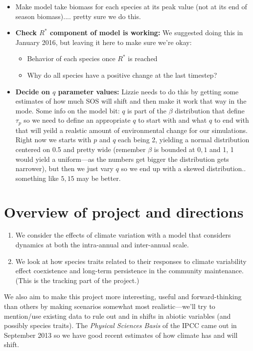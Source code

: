 \documentclass[11pt,a4paper,oneside]{article}
\begin{document}
\begin{itemize}
\item Make model take biomass for each species at its peak value (not at its end of season biomass).... pretty sure we do this.
\item {\bf Check $R^{*}$ component of model is working:} We suggested doing this in January 2016, but leaving it here to make sure we're okay:
\begin{itemize}
\item Behavior of each species once $R^{*}$ is reached
\item Why do all species have a positive change at the last timestep?
\end{itemize}
\item {\bf Decide on $q$ parameter values:}
Lizzie needs to do this by getting some estimates of how much SOS will shift and then make it work that way in the mode. Some info on the model bit: $q$ is part of the $\beta$ distribution that define $\tau_{p}$ so we need to define an appropriate $q$ to start with and what $q$ to end with that will yeild a realstic amount of environmental change for our simulations. Right now we starts with $p$ and $q$ each being 2, yielding a normal distribution centered on 0.5 and pretty wide (remember $\beta$ is bounded at $0,1$ and 1, 1 would yield a uniform---as the numbers get bigger the distribution gets narrower), but then we just vary $q$ so we end up with a skewed distribution.. something like $5,15$ may be better.
\end{itemize}

\newpage
\section{Overview of project and directions}
\noindent 
\begin{enumerate}
\item We consider the effects of climate variation with a model that considers dynamics at both the
intra-annual and inter-annual scale. %
\item We look at how species traits related to their responses to
  climate variability effect coexistence and long-term persistence in the community
  maintenance. (This is the tracking part of the project.) 
\end{enumerate}

\noindent We also aim to make  this project more
interesting, useful and forward-thinking than others by making
scenarios somewhat most realistic---we'll try to mention/use
existing data to rule out and in shifts in abiotic variables (and
possibly species traits). The \emph{Physical Sciences Basis} of the IPCC came out in September 2013 so we have good recent estimates of how climate has and will shift.\\
\end{document}
